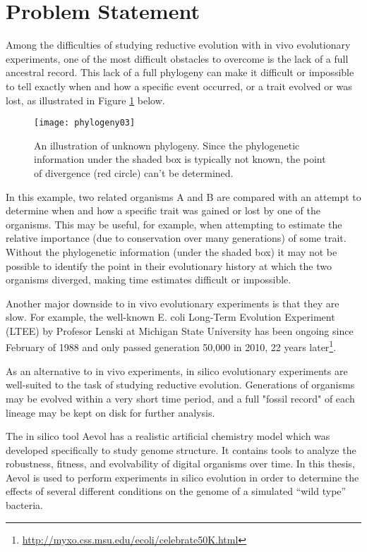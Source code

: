 \section*{Problem Statement} \label{problem_statement}
Among the difficulties of studying reductive evolution with in vivo evolutionary experiments, one of the most difficult obstacles to overcome is the lack of a full ancestral record. This lack of a full phylogeny can make it difficult or impossible to tell exactly when and how a specific event occurred, or a trait evolved or was lost, as illustrated in Figure \ref{fig:phylogeny03} below. 
\begin{figure}[h]
\texttt{[image: phylogeny03]}
\centering
\caption[Unknown phylogeny]{An illustration of unknown phylogeny. Since the phylogenetic information under the shaded box is typically not known, the point of divergence (red circle) can't be determined.}
\label{fig:phylogeny03}
\end{figure}
In this example, two related organisms A and B are compared with an attempt to determine when and how a specific trait was gained or lost by one of the organisms. This may be useful, for example, when attempting to estimate the relative importance (due to conservation over many generations) of some trait. Without the phylogenetic information (under the shaded box) it may not be possible to identify the point in their evolutionary history at which the two organisms diverged, making time estimates difficult or impossible.

Another major downside to in vivo evolutionary experiments is that they are slow. For example, the well-known E. coli Long-Term Evolution Experiment (LTEE) by Profesor Lenski at Michigan State University has been ongoing since February of 1988 and only passed generation 50,000 in 2010, 22 years later\footnote{\url{http://myxo.css.msu.edu/ecoli/celebrate50K.html}}. 

As an alternative to in vivo experiments, in silico evolutionary experiments are well-suited to the task of studying reductive evolution. Generations of organisms may be evolved within a very short time period, and a full "fossil record" of each lineage may be kept on disk for further analysis. 

The in silico tool Aevol has a realistic artificial chemistry model which was developed specifically to study genome structure. It contains tools to analyze the robustness, fitness, and evolvability of digital organisms over time.  In this thesis, Aevol is used to perform experiments in silico evolution in order to determine the effects of several different conditions on the genome of a simulated ``wild type'' bacteria.

